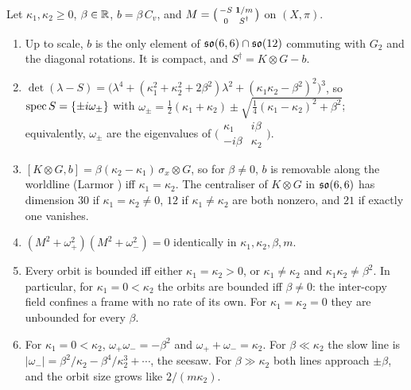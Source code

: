 \begin{theorem}
\label{d5:thm:bfield2}
Let $\kappa_1,\kappa_2\ge0$, $\beta\in\mathbb{R}$, $b=\beta\,C_v$, and $M=\bigl(\begin{smallmatrix}-S&\mathbf 1/m\\0&S^\dagger\end{smallmatrix}\bigr)$ on $(X,\pi)$.
\begin{enumerate}[label=(\roman*),leftmargin=2.2em]
\item Up to scale, $b$ is the only element of $\mathfrak{so}(6,6)\cap\mathfrak{so}(12)$ commuting with $G_2$ and the diagonal rotations. It is compact, and
$S^\dagger=K\otimes G-b$.
\item $\det(\lambda-S)=\bigl(\lambda^4+(\kappa_1^2+\kappa_2^2+2\beta^2)\lambda^2+(\kappa_1\kappa_2-\beta^2)^2\bigr)^3$, so $\operatorname{spec} S=\{\pm i\omega_\pm\}$ with
$\omega_\pm=\tfrac12(\kappa_1+\kappa_2)\pm\sqrt{\tfrac14(\kappa_1-\kappa_2)^2+\beta^2}$; equivalently, $\omega_\pm$ are the eigenvalues of
$\bigl(\begin{smallmatrix}\kappa_1&i\beta\\-i\beta&\kappa_2\end{smallmatrix}\bigr)$.
\item $[K\otimes G,b]=\beta(\kappa_2-\kappa_1)\,\sigma_x\otimes G$, so for $\beta\neq0$, $b$ is removable along the worldline (Larmor \cite{Larmor1897}) iff $\kappa_1=\kappa_2$. The
centraliser of $K\otimes G$ in $\mathfrak{so}(6,6)$ has dimension $30$ if $\kappa_1=\kappa_2\neq0$, $12$ if $\kappa_1\neq\kappa_2$ are both nonzero, and $21$ if
exactly one vanishes.
\item $(M^2+\omega_+^2)(M^2+\omega_-^2)=0$ identically in $\kappa_1,\kappa_2,\beta,m$.
\item Every orbit is bounded iff either $\kappa_1=\kappa_2>0$, or $\kappa_1\neq\kappa_2$ and $\kappa_1\kappa_2\neq\beta^2$. In particular, for $\kappa_1=0<\kappa_2$
the orbits are bounded iff $\beta\neq0$: the inter-copy field confines a frame with no rate of its own. For $\kappa_1=\kappa_2=0$ they are unbounded
for every $\beta$.
\item For $\kappa_1=0<\kappa_2$, $\omega_+\omega_-=-\beta^2$ and $\omega_++\omega_-=\kappa_2$. For $\beta\ll\kappa_2$ the slow line is
$|\omega_-|=\beta^2/\kappa_2-\beta^4/\kappa_2^3+\cdots$, the seesaw. For $\beta\gg\kappa_2$ both lines approach $\pm\beta$, and the orbit size grows like
$2/(m\kappa_2)$.
\end{enumerate}
\end{theorem}

